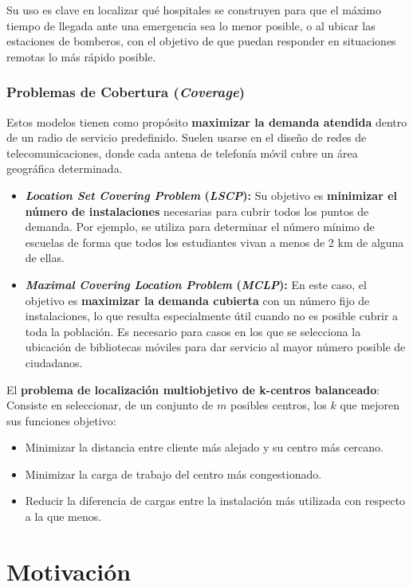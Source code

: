 \documentclass[12pt,a4paper]{book}
\begin{document}
Su uso es clave en localizar qué hospitales se construyen para que el máximo tiempo de llegada ante una emergencia sea lo menor posible, o al ubicar las estaciones de bomberos, con el objetivo de que puedan responder
en situaciones remotas lo más rápido posible.

\subsubsection{Problemas de Cobertura (\textit{Coverage})} 
Estos modelos tienen como propósito \textbf{maximizar la demanda atendida} dentro de un radio de servicio predefinido. 
Suelen usarse en el diseño de redes de telecomunicaciones, donde cada antena de telefonía móvil cubre un área geográfica determinada.

\begin{itemize}
    \item \textbf{\textit{Location Set Covering Problem} (\textit{LSCP}):}
    Su objetivo es \textbf{minimizar el número de instalaciones} necesarias para cubrir todos los puntos de demanda.
Por ejemplo, se utiliza para determinar el número mínimo de escuelas de forma que todos los estudiantes vivan a menos de 2 km de alguna de ellas.

    \item \textbf{\textit{Maximal Covering Location Problem} (\textit{MCLP}):}
En este caso, el objetivo es \textbf{maximizar la demanda cubierta} con un número fijo de instalaciones, lo que resulta especialmente útil cuando no es posible cubrir a toda la población.
Es necesario para casos en los que se selecciona la ubicación de bibliotecas móviles para dar servicio al mayor número posible de ciudadanos.

\end{itemize}

El \textbf{problema de localización multiobjetivo de k-centros balanceado}: Consiste en seleccionar, de un conjunto de $m$ posibles centros, los $k$ que mejoren sus funciones objetivo:
\begin{itemize}
    \item Minimizar la distancia entre cliente más alejado y su centro más cercano.
    \item Minimizar la carga de trabajo del centro más congestionado.
    \item Reducir la diferencia de cargas entre la instalación más utilizada con respecto a la que menos.
\end{itemize}

\section{Motivación}
\end{document}

